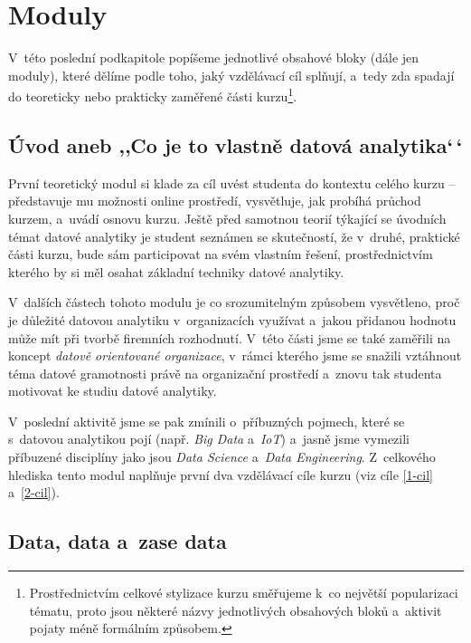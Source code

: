 \hypertarget{moduly}{%
\section{Moduly}\label{moduly}}

V~této poslední podkapitole popíšeme jednotlivé obsahové bloky (dále jen moduly), které dělíme podle toho, jaký vzdělávací cíl splňují, a~tedy zda spadají do teoreticky nebo prakticky zaměřené části kurzu\footnote{Prostřednictvím celkové stylizace kurzu směřujeme k~co největší popularizaci tématu, proto jsou některé názvy jednotlivých obsahových bloků a~aktivit pojaty méně formálním způsobem.}.

\hypertarget{uxfavod-aneb-co-je-to-vlastnux11b-datovuxe1-analytika}{%
\subsection{Úvod aneb ‚‚Co je to vlastně datová analytika`\,`}\label{uxfavod-aneb-co-je-to-vlastnux11b-datovuxe1-analytika}}

První teoretický modul si klade za cíl uvést studenta do kontextu celého kurzu -- představuje mu možnosti online prostředí, vysvětluje, jak probíhá průchod kurzem, a~uvádí osnovu kurzu. Ještě před samotnou teorií týkající se úvodních témat datové analytiky je student seznámen se skutečností, že v~druhé, praktické části kurzu, bude sám participovat na svém vlastním řešení, prostřednictvím kterého by si měl osahat základní techniky datové analytiky.

V~dalších částech tohoto modulu je co srozumitelným způsobem vysvětleno, proč je důležité datovou analytiku v~organizacích využívat a~jakou přidanou hodnotu může mít při tvorbě firemních rozhodnutí. V~této části jsme se také zaměřili na koncept \emph{datově orientované organizace}, v~rámci kterého jsme se snažili vztáhnout téma datové gramotnosti právě na organizační prostředí a~znovu tak studenta motivovat ke studiu datové analytiky.

V~poslední aktivitě jsme se pak zmínili o~příbuzných pojmech, které se s~datovou analytikou pojí (např. \emph{Big Data} a~\emph{IoT}) a~jasně jsme vymezili příbuzené disciplíny jako jsou \emph{Data Science} a~\emph{Data Engineering}. Z~celkového hlediska tento modul naplňuje první dva vzdělávací cíle kurzu (viz cíle \ref{1-cil} a~\ref{2-cil}).

\hypertarget{data-data-a-zase-data}{%
\subsection{Data, data a~zase data}\label{data-data-a-zase-data}}

